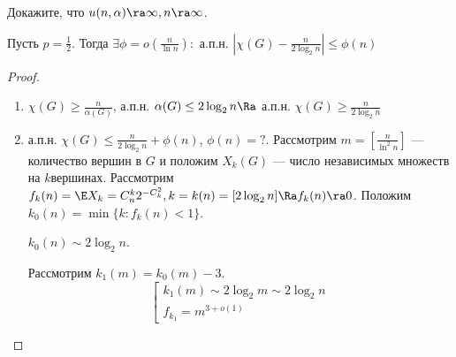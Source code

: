 \begin{exercise}
    Докажите, что \(u(n, \alpha) \ra \infty, n \ra \infty\).
\end{exercise}

\begin{theorem}[Боллобаш]
    Пусть \(p = \frac{1}{2}\). Тогда \(\exists \phi = o\left( \frac{n}{\ln n} \right):\) а.п.н. \(\left| \chi(G) - \frac{n}{2\log_2 n} \right| \le \phi(n)\)
\end{theorem}
\begin{proof}\indent
    \begin{enumerate}
        \item \(\chi(G) \ge \frac{n}{\alpha(G)}\), а.п.н. \(\alpha(G) \le 2\log_2 n \Ra\) а.п.н. \(\chi(G) \ge \frac{n}{2\log_2 n}\)
        \item а.п.н. \(\chi(G) \le \frac{n}{2\log_2 n} + \phi(n)\), \(\phi(n) = ?\). Рассмотрим \(m = \left[ \frac{n}{\ln^2n} \right]\) --- количество вершин в \(G\) и положим \(X_k(G)\) --- число независимых множеств на \(k\)вершинах. Рассмотрим \(f_k(n) = \E X_k = C_n^k 2^{-C_k^2}, k = k(n) = [2\log_2n] \Ra f_k(n) \ra 0\). Положим \(k_0(n) = \min\{k: f_k(n) < 1\}\).
        
        \begin{exercise}
            \(k_0(n) \sim 2\log_2n\).
        \end{exercise}

        Рассмотрим \(k_1(m) = k_0(m) - 3\).
        \[\left[\begin{array}{l}
            k_1(m) \sim 2\log_2m \sim 2\log_2n \\
            f_{k_1} = m^{3 + o(1)}
        \end{array}\right.\]
    \end{enumerate}
\end{proof}
